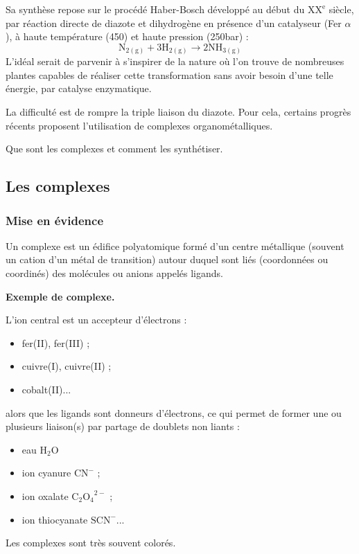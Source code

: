 Sa synthèse repose sur le procédé Haber-Bosch développé au début du $\mathrm{XX^e}$ siècle, par réaction directe de diazote et dihydrogène en présence d'un catalyseur (Fer $\alpha$), à haute température (\unit{450}{\celsius}) et haute pression (\unit{250}{bar}) :
\begin{equation*}
\mathrm{N_{2(g)}} + 3\mathrm{H_{2(g)}} \rightarrow 2\mathrm{NH_{3(g)}}
\end{equation*}
L'idéal serait de parvenir à s'inspirer de la nature où l'on trouve de nombreuses plantes capables de réaliser cette transformation sans avoir besoin d'une telle énergie, par catalyse enzymatique.

La difficulté est de rompre la triple liaison du diazote. 
Pour cela, certains progrès récents proposent l'utilisation de complexes organométalliques.

\begin{transition}
Que sont les complexes et comment les synthétiser.
\end{transition}

\subsection{Les complexes}

\subsubsection{Mise en évidence}

Un complexe est un édifice polyatomique formé d'un centre métallique (souvent un cation d'un métal de transition) autour duquel sont liés (coordonnées ou coordinés) des molécules ou anions appelés ligands.

\begin{slide}
\textbf{Exemple de complexe.}
\end{slide}

L'ion central est un accepteur d'électrons :
\begin{itemize}
\item fer(II), fer(III) ;
\item cuivre(I), cuivre(II) ;
\item cobalt(II)...
\end{itemize}
alors que les ligands sont donneurs d'électrons, ce qui permet de former une ou plusieurs liaison(s) par partage de doublets non liants :
\begin{itemize}
\item eau $\mathrm{H_2O}$
\item ion cyanure $\mathrm{CN}^-$ ;
\item ion oxalate $\mathrm{C_2O_4}^{2-}$ ;
\item ion thiocyanate $\mathrm{SCN^-}$...
\end{itemize}
Les complexes sont très souvent colorés.

